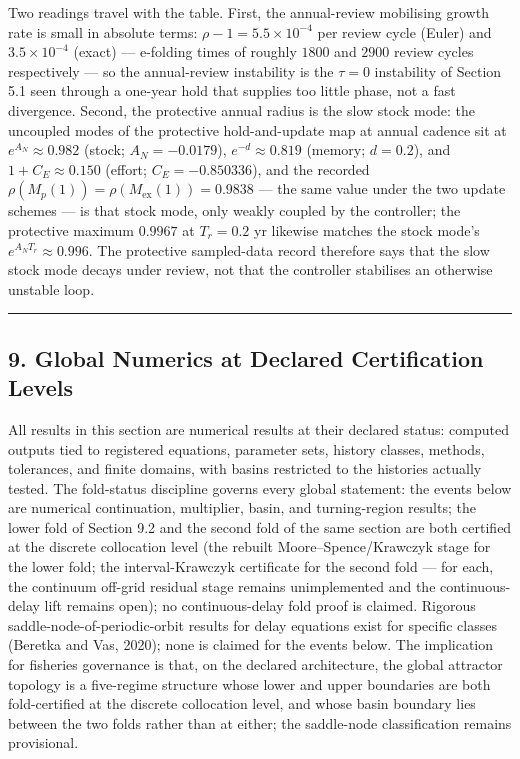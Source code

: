 \documentclass[11pt]{article}
\begin{document}
Two readings travel with the table. First, the annual-review mobilising
growth rate is small in absolute terms: \(\rho - 1 = 5.5\times10^{-4}\)
per review cycle (Euler) and \(3.5\times10^{-4}\) (exact) --- e-folding
times of roughly \(1800\) and \(2900\) review cycles respectively --- so
the annual-review instability is the \(\tau = 0\) instability of Section
5.1 seen through a one-year hold that supplies too little phase, not a
fast divergence. Second, the protective annual radius is the slow stock
mode: the uncoupled modes of the protective hold-and-update map at
annual cadence sit at \(e^{A_N} \approx 0.982\) (stock;
\(A_N = -0.0179\)), \(e^{-d} \approx 0.819\) (memory; \(d = 0.2\)), and
\(1 + C_E \approx 0.150\) (effort; \(C_E = -0.850336\)), and the
recorded \(\rho(M_p(1)) = \rho(M_{\mathrm{ex}}(1)) = 0.9838\) --- the
same value under the two update schemes --- is that stock mode, only
weakly coupled by the controller; the protective maximum \(0.9967\) at
\(T_r = 0.2\) yr likewise matches the stock mode's
\(e^{A_N T_r} \approx 0.996\). The protective sampled-data record
therefore says that the slow stock mode decays under review, not that
the controller stabilises an otherwise unstable loop.

\begin{center}\rule{0.5\linewidth}{0.5pt}\end{center}

\subsection{9. Global Numerics at Declared Certification
Levels}\label{global-numerics-at-declared-certification-levels}

All results in this section are numerical results at their declared
status: computed outputs tied to registered equations, parameter sets,
history classes, methods, tolerances, and finite domains, with basins
restricted to the histories actually tested. The fold-status discipline
governs every global statement: the events below are numerical
continuation, multiplier, basin, and turning-region results; the lower
fold of Section 9.2 and the second fold of the same section are both
certified at the discrete collocation level (the rebuilt
Moore--Spence/Krawczyk stage for the lower fold; the interval-Krawczyk
certificate for the second fold --- for each, the continuum off-grid
residual stage remains unimplemented and the continuous-delay lift
remains open); no continuous-delay fold proof is claimed. Rigorous
saddle-node-of-periodic-orbit results for delay equations exist for
specific classes (Beretka and Vas, 2020); none is claimed for the events
below. The implication for fisheries governance is that, on the declared
architecture, the global attractor topology is a five-regime structure
whose lower and upper boundaries are both fold-certified at the discrete
collocation level, and whose basin boundary lies between the two folds
rather than at either; the saddle-node classification remains
provisional.
\end{document}
